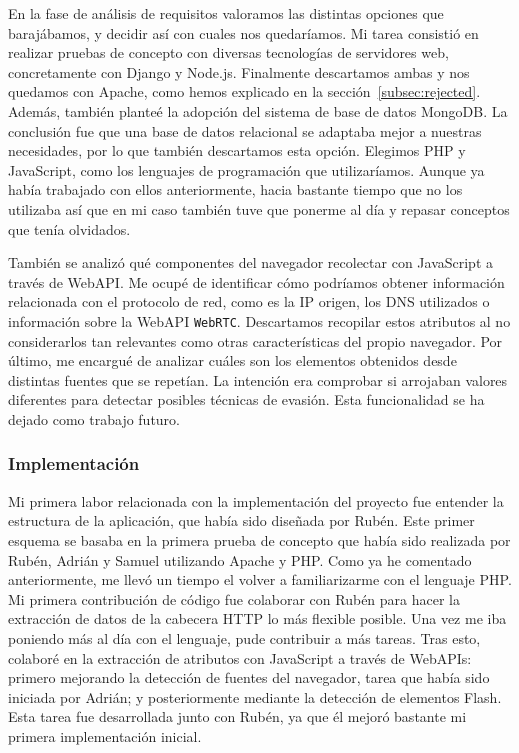 En la fase de análisis de requisitos valoramos las distintas opciones que barajábamos, y decidir así con cuales nos quedaríamos. Mi tarea consistió en realizar pruebas de concepto con diversas tecnologías de servidores web, concretamente con Django y Node.js. Finalmente descartamos ambas y nos quedamos con Apache, como hemos explicado en la sección~\ref{subsec:rejected}. Además, también planteé la adopción del sistema de base de datos MongoDB. La conclusión fue que una base de datos relacional se adaptaba mejor a nuestras necesidades, por lo que también descartamos esta opción. Elegimos PHP y JavaScript, como los lenguajes de programación que utilizaríamos. Aunque ya había trabajado con ellos anteriormente, hacia bastante tiempo que no los utilizaba así que en mi caso también tuve que ponerme al día y repasar conceptos que tenía olvidados. \par 

También se analizó qué componentes del navegador recolectar con JavaScript a través de WebAPI. Me ocupé de identificar cómo podríamos obtener información relacionada con el protocolo de red, como es la IP origen, los DNS utilizados o información sobre la WebAPI \texttt{WebRTC}. Descartamos recopilar estos atributos al no considerarlos tan relevantes como otras características del propio navegador. Por último, me encargué de analizar cuáles son los elementos obtenidos desde distintas fuentes que se repetían. La intención era comprobar si arrojaban valores diferentes para detectar posibles técnicas de evasión. Esta funcionalidad se ha dejado como trabajo futuro. \par 

\subsubsection{Implementación}

Mi primera labor relacionada con la implementación del proyecto fue entender la estructura de la aplicación, que había sido diseñada por Rubén. Este primer esquema se basaba en la primera prueba de concepto que había sido realizada por Rubén, Adrián y Samuel utilizando Apache y PHP. Como ya he comentado anteriormente, me llevó un tiempo el volver a familiarizarme con el lenguaje PHP. Mi primera contribución de código fue colaborar con Rubén para hacer la extracción de datos de la cabecera HTTP lo más flexible posible. Una vez me iba poniendo más al día con el lenguaje, pude contribuir a más tareas. Tras esto, colaboré en la extracción de atributos con JavaScript a través de WebAPIs: primero mejorando la detección de fuentes del navegador, tarea que había sido iniciada por Adrián; y posteriormente mediante la detección de elementos Flash. Esta tarea fue desarrollada junto con Rubén, ya que él mejoró bastante mi primera implementación inicial. \par 

